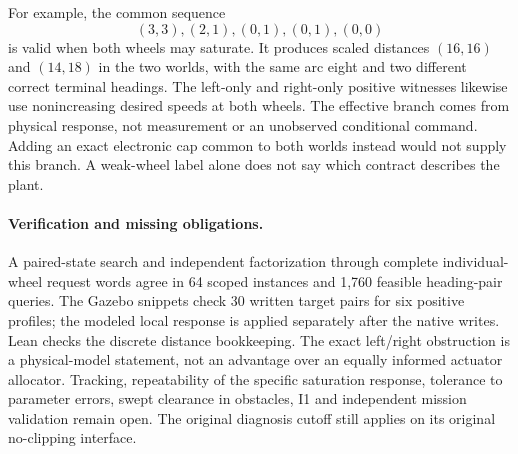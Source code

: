\documentclass{article}
\begin{document}
For example, the common sequence
\[
 (3,3),(2,1),(0,1),(0,1),(0,0)
\]
is valid when both wheels may saturate. It produces scaled
distances \((16,16)\) and \((14,18)\) in the two worlds, with
the same arc eight and two different correct terminal headings.
The left-only and right-only positive witnesses likewise use
nonincreasing desired speeds at both wheels. The effective branch comes from physical response,
not measurement or an unobserved conditional command. Adding
an exact electronic cap common to both worlds instead would
not supply this branch. A weak-wheel label alone does not say
which contract describes the plant.

\paragraph{Verification and missing obligations.}
A paired-state search and independent factorization through
complete individual-wheel request words agree in 64 scoped instances and 1,760 feasible heading-pair queries. The Gazebo snippets check 30 written target pairs
for six positive profiles; the modeled local response is applied
separately after the native writes. Lean checks the discrete
distance bookkeeping. The exact left/right obstruction is a
physical-model statement, not an advantage over an equally
informed actuator allocator. Tracking, repeatability of the
specific saturation response, tolerance to parameter errors,
swept clearance in obstacles, I1 and independent mission
validation remain open. The original diagnosis cutoff still
applies on its original no-clipping interface.
\end{document}
